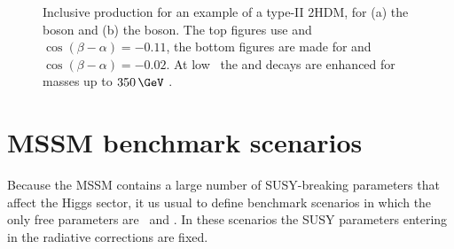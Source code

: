 \begin{figure}[h!]
\begin{center}
\end{center}
\caption[Inclusive production \xsbr for an example of a type-II 2HDM, for the \PHiggs and \PHiggsps boson.]{Inclusive production \xsbr for an example
of a type-II \ac{2HDM}, for (a) the \PHiggs boson and (b) the \PHiggsps boson. The
top figures use  and $\cos{(\beta-\alpha)}=-0.11$, the bottom
figures are made for  and $\cos{(\beta-\alpha)}=-0.02$. At low \tanb~the \Htohh and
\AtoZh decays are enhanced for masses up to $350\,\GeV$ \cite{2HDM-II}.}
\label{fig:2hdm_Hxsbr}
\end{figure}


\section{MSSM benchmark scenarios}
\label{sec:theory_BSM_models}
Because the MSSM contains a large number of
SUSY-breaking parameters that affect the Higgs
sector, it us usual to define benchmark scenarios 
in which the only free parameters are \mA~and \tanb.
In these scenarios the SUSY parameters entering in 
the radiative corrections are fixed.

